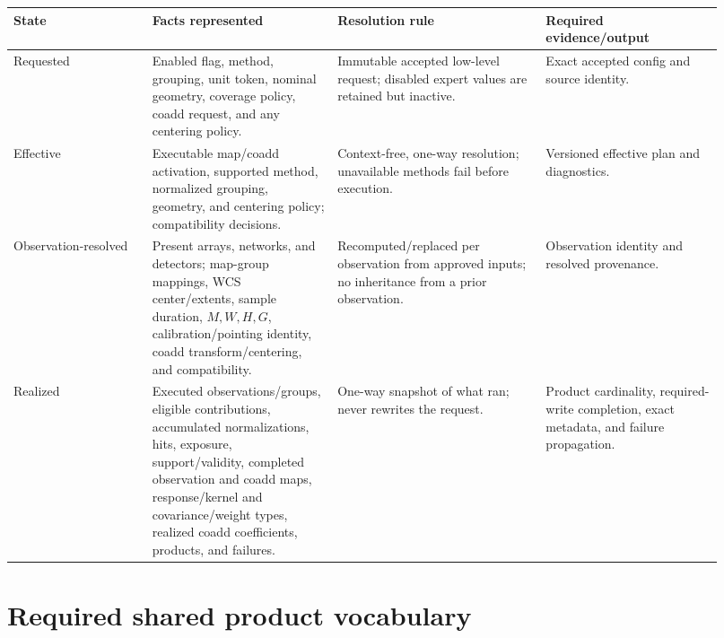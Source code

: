 \documentclass[11pt]{article}
\begin{document}
\begin{longtable}{L{0.18\linewidth}L{0.24\linewidth}L{0.27\linewidth}L{0.23\linewidth}}
\toprule
State & Facts represented & Resolution rule & Required evidence/output\\
\midrule
Requested & Enabled flag, method, grouping, unit token, nominal geometry,
coverage policy, coadd request, and any centering policy. & Immutable accepted low-level request;
disabled expert values are retained but inactive. & Exact accepted config and
source identity.\\
Effective & Executable map/coadd activation, supported method, normalized
grouping, geometry, and centering policy; compatibility decisions. & Context-free, one-way
resolution; unavailable methods fail before execution. & Versioned effective
plan and diagnostics.\\
Observation-resolved & Present arrays, networks, and detectors; map-group mappings,
WCS center/extents, sample duration, \(M,W,H,G\), calibration/pointing identity,
coadd transform/centering, and compatibility. & Recomputed/replaced per observation from approved
inputs; no inheritance from a prior observation. & Observation identity and
resolved provenance.\\
Realized & Executed observations/groups, eligible contributions, accumulated
normalizations, hits, exposure, support/validity, completed observation and
coadd maps, response/kernel and covariance/weight types, realized coadd
coefficients, products, and failures. & One-way snapshot of what ran; never
rewrites the request. & Product cardinality, required-write completion, exact
metadata, and failure propagation.\\
\bottomrule
\end{longtable}

\clearpage
\section{Required shared product vocabulary}
\end{document}
